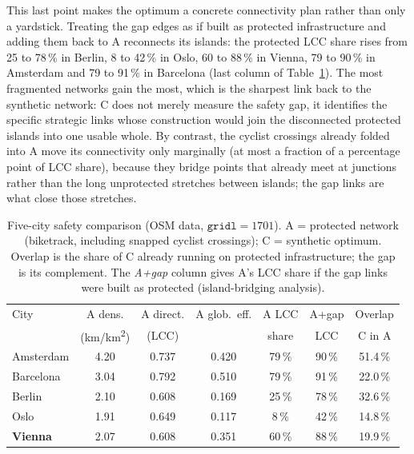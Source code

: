 \documentclass[11pt,a4paper]{article}
\begin{document}
This last point makes the optimum a concrete connectivity plan rather than only a yardstick.
Treating the gap edges as if built as protected infrastructure and adding them back to A
reconnects its islands: the protected LCC share rises from 25 to 78\,\% in Berlin, 8 to
42\,\% in Oslo, 60 to 88\,\% in Vienna, 79 to 90\,\% in Amsterdam and 79 to 91\,\% in
Barcelona (last column of Table~\ref{tab:safety}). The most fragmented networks gain the
most, which is the sharpest link back to the synthetic network: C does not merely measure
the safety gap, it identifies the specific strategic links whose construction would join the
disconnected protected islands into one usable whole. By contrast, the cyclist crossings
already folded into A move its connectivity only marginally (at most a fraction of a
percentage point of LCC share), because they bridge points that already meet at junctions
rather than the long unprotected stretches between islands; the gap links are what close
those stretches.

\begin{table}[t]
\centering
\caption{Five-city safety comparison (OSM data, \(\texttt{gridl}=1701\)). A = protected
network (biketrack, including snapped cyclist crossings); C = synthetic optimum. Overlap is
the share of C already running on protected infrastructure; the gap is its complement. The
\emph{A+gap} column gives A's LCC share if the gap links were built as protected
(island-bridging analysis).}
\label{tab:safety}
\small
\begin{tabular}{lcccccc}
\toprule
City & A dens. & A direct. & A glob.\ eff. & A LCC & A+gap & Overlap \\
 & (km/km\textsuperscript{2}) & (LCC) & & share & LCC & C in A \\
\midrule
Amsterdam & 4.20 & 0.737 & 0.420 & 79\,\% & 90\,\% & 51.4\,\% \\
Barcelona & 3.04 & 0.792 & 0.510 & 79\,\% & 91\,\% & 22.0\,\% \\
Berlin    & 2.10 & 0.608 & 0.169 & 25\,\% & 78\,\% & 32.6\,\% \\
Oslo      & 1.91 & 0.649 & 0.117 & 8\,\%  & 42\,\% & 14.8\,\% \\
\textbf{Vienna} & 2.07 & 0.608 & 0.351 & 60\,\% & 88\,\% & 19.9\,\% \\
\bottomrule
\end{tabular}
\end{table}
\end{document}
